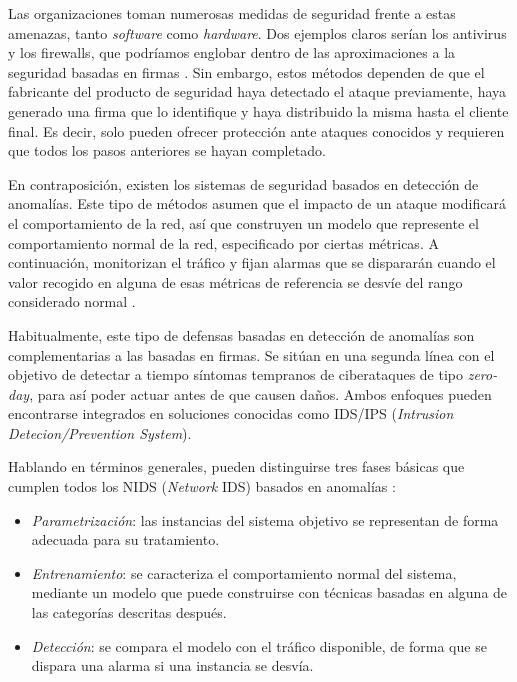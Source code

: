 Las organizaciones toman numerosas medidas de seguridad frente a estas amenazas, tanto \emph{software} como \emph{hardware}.
Dos ejemplos claros serían los antivirus y los firewalls, que podríamos englobar dentro de las aproximaciones a la seguridad basadas en firmas \cite{Alconzo_2019}.
Sin embargo, estos métodos dependen de que el fabricante del producto de seguridad haya detectado el ataque previamente, haya generado una firma que lo identifique y haya distribuido la misma hasta el cliente final.
Es decir, solo pueden ofrecer protección ante ataques conocidos y requieren que todos los pasos anteriores se hayan completado.

En contraposición, existen los sistemas de seguridad basados en detección de anomalías.
Este tipo de métodos asumen que el impacto de un ataque modificará el comportamiento de la red, así que construyen un modelo que represente el comportamiento normal de la red, especificado por ciertas métricas.
A continuación, monitorizan el tráfico y fijan alarmas que se dispararán cuando el valor recogido en alguna de esas métricas de referencia se desvíe del rango considerado normal \cite{Boutaba_2018}.

Habitualmente, este tipo de defensas basadas en detección de anomalías son complementarias a las basadas en firmas.
Se sitúan en una segunda línea con el objetivo de detectar a tiempo síntomas tempranos de ciberataques de tipo \emph{zero-day}, para así poder actuar antes de que causen daños.
Ambos enfoques pueden encontrarse integrados en soluciones conocidas como IDS/IPS (\emph{Intrusion Detecion/Prevention System}).

Hablando en términos generales, pueden distinguirse tres fases básicas que cumplen todos los NIDS (\emph{Network} IDS) basados en anomalías \cite{GarciaTeodoro_2009}:
\begin{itemize}
    \item \emph{Parametrización}: las instancias del sistema objetivo se representan de forma adecuada para su tratamiento.
    \item \emph{Entrenamiento}: se caracteriza el comportamiento normal del sistema, mediante un modelo que puede construirse con técnicas basadas en alguna de las categorías descritas después.
    \item \emph{Detección}: se compara el modelo con el tráfico disponible, de forma que se dispara una alarma si una instancia se desvía.
\end{itemize}

